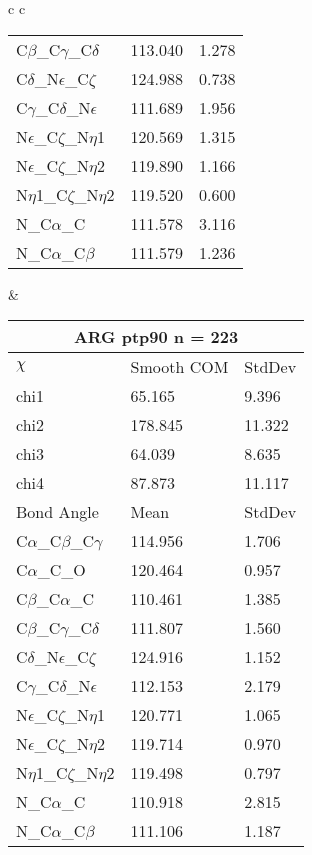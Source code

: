 \begin{longtable}{ c c }
\begin{tabular}{ l l l }
  C$\beta$\_C$\gamma$\_C$\delta$ & 113.040 & 1.278\\
  C$\delta$\_N$\epsilon$\_C$\zeta$ & 124.988 & 0.738\\
  C$\gamma$\_C$\delta$\_N$\epsilon$ & 111.689 & 1.956\\
  N$\epsilon$\_C$\zeta$\_N$\eta$1 & 120.569 & 1.315\\
  N$\epsilon$\_C$\zeta$\_N$\eta$2 & 119.890 & 1.166\\
  N$\eta$1\_C$\zeta$\_N$\eta$2 & 119.520 & 0.600\\
  N\_C$\alpha$\_C & 111.578 & 3.116\\
  N\_C$\alpha$\_C$\beta$ & 111.579 & 1.236\\
  \bottomrule
  \end{tabular}
  &
  \begin{tabular}{ l l l }
  \toprule
  \multicolumn{3}{c}{ARG \textbf{ptp90} n = 223} \\ \toprule
  $\chi$       & Smooth COM & StdDev \\ \midrule
  chi1 & 65.165 & 9.396 \\ 
  chi2 & 178.845 & 11.322 \\ 
  chi3 & 64.039 & 8.635 \\ 
  chi4 & 87.873 & 11.117 \\ \midrule
  Bond Angle   & Mean     & StdDev \\ \midrule
  C$\alpha$\_C$\beta$\_C$\gamma$ & 114.956 & 1.706\\
  C$\alpha$\_C\_O & 120.464 & 0.957\\
  C$\beta$\_C$\alpha$\_C & 110.461 & 1.385\\
  C$\beta$\_C$\gamma$\_C$\delta$ & 111.807 & 1.560\\
  C$\delta$\_N$\epsilon$\_C$\zeta$ & 124.916 & 1.152\\
  C$\gamma$\_C$\delta$\_N$\epsilon$ & 112.153 & 2.179\\
  N$\epsilon$\_C$\zeta$\_N$\eta$1 & 120.771 & 1.065\\
  N$\epsilon$\_C$\zeta$\_N$\eta$2 & 119.714 & 0.970\\
  N$\eta$1\_C$\zeta$\_N$\eta$2 & 119.498 & 0.797\\
  N\_C$\alpha$\_C & 110.918 & 2.815\\
  N\_C$\alpha$\_C$\beta$ & 111.106 & 1.187\\
  \bottomrule
  \end{tabular}
  \\
  \begin{tabular}{ l l l }

\end{tabular}
\end{longtable}
